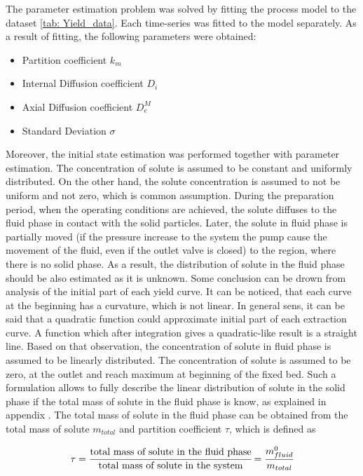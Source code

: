 \documentclass[../Article_Model_Parameters.tex]{subfiles}
\begin{document}
	
	\label{CH: Results}

    The parameter estimation problem was solved by fitting the process model to the dataset \ref{tab: Yield_data}. Each time-series was fitted to the model separately. As a result of fitting, the following parameters were obtained:

    \begin{itemize}
        \item Partition coefficient $k_m$
        \item Internal Diffusion coefficient $D_i$
        \item Axial Diffusion coefficient $D_e^M$
        \item Standard Deviation $\sigma$
    \end{itemize}

    Moreover, the initial state estimation was performed together with parameter estimation. The concentration of solute is assumed to be constant and uniformly distributed. On the other hand, the solute concentration is assumed to not be uniform and not zero, which is common assumption. During the preparation period, when the operating conditions are achieved, the solute diffuses to the fluid phase in contact with the solid particles. Later, the solute in fluid phase is partially moved (if the pressure increase to the system the pump cause the movement of the fluid, even if the outlet valve is closed) to the region, where there is no solid phase. As a result, the distribution of solute in the fluid phase should be also estimated as it is unknown. Some conclusion can be drown from analysis of the initial part of each yield curve. It can be noticed, that each curve at the beginning has a curvature, which is not linear. In general sens, it can be said that a quadratic function could approximate initial part of each extraction curve. A function which after integration gives a quadratic-like result is a straight line. Based on that observation, the concentration of solute in fluid phase is assumed to be linearly distributed. The concentration of solute is assumed to be zero, at the outlet and reach maximum at beginning of the fixed bed. Such a formulation allows to fully describe the linear distribution of solute in the solid phase if the total mass of solute in the fluid phase is know, as explained in appendix . The total mass of solute in the fluid phase can be obtained from the total mass of solute $m_{total}$ and partition coefficient $\tau$, which is defined as

    {\footnotesize
    \begin{equation*}
        \tau = \cfrac{\text{total mass of solute in the fluid phase}}{\text{total mass of solute in the system}} = \cfrac{m^0_{fluid}}{m_{total}}
    \end{equation*}
    }
\end{document}
